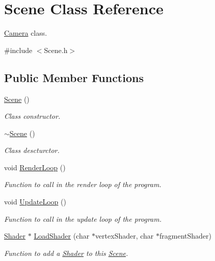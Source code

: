\hypertarget{class_scene}{}\section{Scene Class Reference}
\label{class_scene}


\hyperlink{class_camera}{Camera} class.  




{\ttfamily \#include $<$Scene.\+h$>$}

\subsection*{Public Member Functions}
\begin{DoxyCompactItemize}
\item 
\hyperlink{class_scene_ad10176d75a9cc0da56626f682d083507}{Scene} ()
\begin{DoxyCompactList}\small\item\em Class constructor. \end{DoxyCompactList}\item 
\hyperlink{class_scene_a3b8cec2e32546713915f8c6303c951f1}{$\sim$\+Scene} ()
\begin{DoxyCompactList}\small\item\em Class descturctor. \end{DoxyCompactList}\item 
void \hyperlink{class_scene_a71708279f69885e838e288c6689ddd1c}{Render\+Loop} ()
\begin{DoxyCompactList}\small\item\em Function to call in the render loop of the program. \end{DoxyCompactList}\item 
void \hyperlink{class_scene_ab0293e9c900f18ce4ca26621d4b7ddfe}{Update\+Loop} ()
\begin{DoxyCompactList}\small\item\em Function to call in the update loop of the program. \end{DoxyCompactList}\item 
\hyperlink{class_shader}{Shader} $\ast$ \hyperlink{class_scene_a6f0f7af3d07acbee2d6864c3ded98351}{Load\+Shader} (char $\ast$vertex\+Shader, char $\ast$fragment\+Shader)
\begin{DoxyCompactList}\small\item\em Function to add a \hyperlink{class_shader}{Shader} to this \hyperlink{class_scene}{Scene}. \end{DoxyCompactList}\item 

\end{DoxyCompactItemize}

